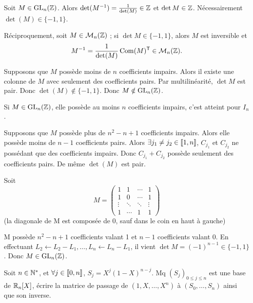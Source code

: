 \begin{solution}
Soit $M\in\operatorname{GL}_n(\mathbb Z)$. Alors
$\det(M^{-1})=\frac1{\det(M)}\in\mathbb Z$ et $\det M\in\mathbb Z$. Nécessairement
$\det(M)\in\{-1,1\}$.

Réciproquement, soit $M\in\mathcal M_n(\mathbb Z)$ ; si $\det M\in\{-1,1\}$, alors $M$ est inversible
et
\[
M^{-1}=\frac1{\det(M)}\operatorname{Com}(M)^{\mathsf T}\in\mathcal M_n(\mathbb Z).
\]


Supposons que $M$ possède moins de $n$ coefficients impairs. Alors il existe une colonne de
$M$ avec seulement des coefficients pairs. Par multilinéarité, $\det M$ est pair. Donc
$\det(M)\notin\{-1,1\}$. Donc $M\notin\operatorname{GL}_n(\mathbb Z)$.

Si $M\in\operatorname{GL}_n(\mathbb Z)$, elle possède au moins $n$ coefficients impairs, c'est atteint pour
$I_n$.

Supposons que $M$ possède plus de $n^2-n+1$ coefficients impairs. Alors elle possède moins
de $n-1$ coefficients pairs. Alors $\exists j_1\neq j_2\in\llbracket 1,n\rrbracket$, $C_{j_1}$
et $C_{j_2}$ ne possédant que des coefficients impairs. Donc $C_{j_1}+C_{j_2}$ possède
seulement des coefficients pairs. De même $\det(M)$ est pair.

Soit
\[
M=\begin{pmatrix}
1&1&\cdots&1\\1&0&\cdots&1\\\vdots&\ddots&\ddots&\vdots\\1&\cdots&1&1
\end{pmatrix}
\]
(la diagonale de M est composée de 0, sauf dans le coin en haut à gauche)

M possède $n^2-n+1$ coefficients valant 1 et $n-1$ coefficients valant 0. En effectuant
$L_2\leftarrow L_2-L_1,\ldots,L_n\leftarrow L_n-L_1$, il vient
$\det M=(-1)^{n-1}\in\{-1,1\}$. Donc $M\in\operatorname{GL}_n(\mathbb Z)$.
\end{solution}


\begin{statementbox}
Soit $n\in\mathbb N^*$, et $\forall j\in\llbracket 0,n\rrbracket$,
$S_j=X^j(1-X)^{n-j}$. Mq $(S_j)_{0\leq j\leq n}$ est une base de $\mathbb R_n[X]$, écrire la
matrice de passage de $(1,X,\ldots,X^n)$ à $(S_0,\ldots,S_n)$ ainsi que son inverse.
\end{statementbox}

